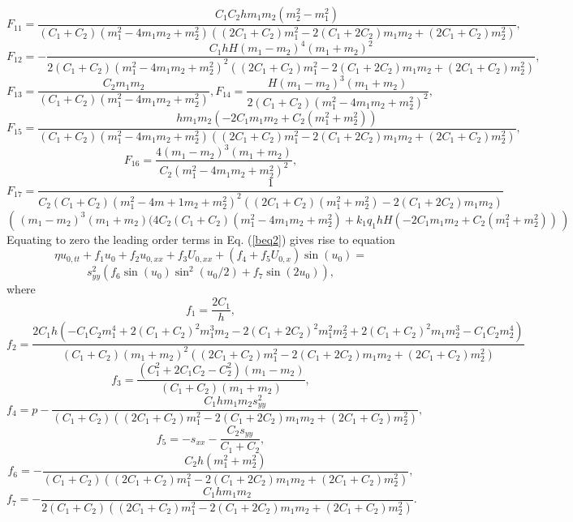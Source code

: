 \[
F_{11}=\frac{C_1 C_2 h  m_1 m_2 (m_2^2-m_1^2) }{(C_1 + C_2) (m_1^2 - 
	4 m_1 m_2 + m_2^2) ((2 C_1 + C_2) m_1^2 - 
	2 (C_1 + 2 C_2) m_1 m_2 + (2 C_1 + C_2) m_2^2)},
\]
\[
F_{12}=-\frac{C_1 h H  (m_1 - m_2)^4 (m_1 + m_2)^2 }{2(C_1 + C_2) (m_1^2 - 
	4 m_1 m_2 + m_2^2)^2 ((2 C_1 + C_2) m_1^2 - 
	2 (C_1 + 2 C_2) m_1 m_2 + (2 C_1 + C_2) m_2^2)},
\]
\[
F_{13}=\frac{C_2  m_1 m_2 }{(C_1 + C_2) (m_1^2 - 4 m_1 m_2 + m_2^2)},
F_{14}=\frac{H  (m_1 - m_2)^3 (m_1 + m_2) }{2(C_1 + C_2) (m_1^2 - 4 m_1 m_2 + 
	m_2^2)^2},
\]
\[
F_{15}=\frac{h  m_1 m_2 (-2 C_1 m_1 m_2 + C_2 (m_1^2 + m_2^2)) }{(C_1 + 
	C_2) (m_1^2 - 4 m_1 m_2 + m_2^2) ((2 C_1 + C_2) m_1^2 - 
	2 (C_1 + 2 C_2) m_1 m_2 + (2 C_1 + C_2) m_2^2)},
\]
\[
F_{16}=\frac{4 (m_1 - m_2)^3 (m_1 + m_2)}{C_2 (m_1^2 - 4 m_1 m_2 + m_2^2)^2},
\]
\[
F_{17}=\frac{1}    {C_2 (C_1 + 
	C_2) (m_1^2 - 4 m+1 m_2 + m_2^2)^2 ((2 C_1 + C_2) (m_1^2+m_2^2) - 
	2 (C_1 + 2 C_2) m_1 m_2 )}
\]
\[
\left(\frac{}{} (m_1 - m_2)^3 (m_1 + m_2) (4 C_2 (C_1 + C_2) (m_1^2 - 4 m_1 m_2 + m_2^2) + 
k_1 q_1 h H (-2 C_1 m_1 m_2 + C_2 (m_1^2 + m_2^2)) \frac{}{} \right)
\]
Equating to zero the leading order terms in Eq. (\ref{beq2}) gives rise to  equation
\[
\eta u_{0,tt}+f_1 u_0+f_2 u_{0,xx}+f_3 U_{0,xx}+(f_4+f_5 U_{0,x})\sin(u_0)=
\]
\begin{equation}
	s_{yy}^2 (f_6 \sin(u_0) \sin^2(u_0/2)+f_7 \sin(2 u_0)), \label{goveq2}
\end{equation}
where
\[
f_1=\frac{2 C_1}{h},
\]
\[
f_2=\frac{2 C_1 h (-C_1 C_2 m_1^4 + 2 (C_1 + C_2)^2 m_1^3 m_2 - 
	2 (C_1 + 2 C_2)^2 m_1^2 m_2^2 + 2 (C_1 + C_2)^2 m_1 m_2^3 - 
	C_1 C_2 m_2^4)}{(C_1 + C_2) (m_1 + m_2)^2 ((2 C_1 + C_2) m_1^2 - 
	2 (C_1 + 2 C_2) m_1 m_2 + (2 C_1 + C_2) m_2^2)}
\]
\[
f_3=\frac{(C_1^2 + 2 C_1 C_2 - C_2^2) (m_1 - m_2)}{(C_1 + C_2) (m_1 + m_2)},
\]
\[
f_4=p - \frac{C_1 h m_1 m_2 s_{yy}^2}{(C_1 + C_2) ((2 C_1 + C_2) m_1^2 - 
	2 (C_1 + 2 C_2) m_1 m_2 + (2 C_1 + C_2) m_2^2)},
\]
\[
f_5=- s_{xx} - \frac{C_2 s_{yy}}{C_1 + C_2},
\]
\[
f_6=-\frac{C_2 h (m_1^2 + m_2^2)}{(C_1 + C_2) ((2 C_1 + C_2) m_1^2 - 
	2 (C_1 + 2 C_2) m_1 m_2 + (2 C_1 + C_2) m_2^2)},
\]
\[
f_7=-\frac{C_1 h m_1 m_2 }{2(C_1 + C_2) ((2 C_1 + C_2) m_1^2 - 
	2 (C_1 + 2 C_2) m_1 m_2 + (2 C_1 + C_2) m_2^2)}.
\]
